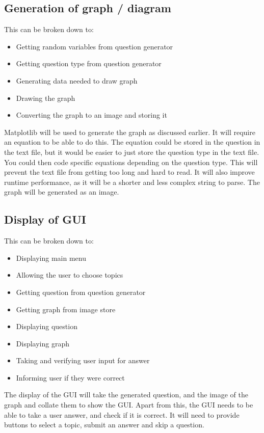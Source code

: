 \subsection{Generation of graph / diagram}
This can be broken down to:
\begin{itemize}
	\item Getting random variables from question generator
	\item Getting question type from question generator
	\item Generating data needed to draw graph
	\item Drawing the graph
	\item Converting the graph to an image and storing it
\end{itemize} 
Matplotlib will be used to generate the graph as discussed earlier. It will require an equation to be able to do this. The equation could be stored in the question in the text file, but it would be easier to just store the question type in the text file. You could then code specific equations depending on the question type. This will prevent the text file from getting too long and hard to read. It will also improve runtime performance, as it will be a shorter and less complex string to parse. The graph will be generated as an image.
\subsection{Display of GUI}
This can be broken down to:
\begin{itemize}
	\item Displaying main menu
	\item Allowing the user to choose topics
	\item Getting question from question generator
	\item Getting graph from image store
	\item Displaying question
	\item Displaying graph
	\item Taking and verifying user input for answer
	\item Informing user if they were correct
\end{itemize}
The display of the GUI will take the generated question, and the image of the graph and collate them to show the GUI. Apart from this, the GUI needs to be able to take a user answer, and check if it is correct. It will need to provide buttons to select a topic, submit an answer and skip a question.
